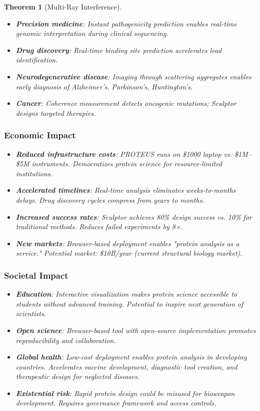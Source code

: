 \documentclass[11pt,a4paper]{article}
\newtheorem{theorem}{Theorem}[section]
\begin{document}
\begin{theorem}[Multi-Ray Interference]
\begin{itemize}
\item \textbf{Precision medicine}: Instant pathogenicity prediction enables real-time genomic interpretation during clinical sequencing.
\item \textbf{Drug discovery}: Real-time binding site prediction accelerates lead identification.
\item \textbf{Neurodegenerative disease}: Imaging through scattering aggregates enables early diagnosis of Alzheimer's, Parkinson's, Huntington's.
\item \textbf{Cancer}: Coherence measurement detects oncogenic mutations; Sculptor designs targeted therapies.
\end{itemize}

\subsubsection{Economic Impact}

\begin{itemize}
\item \textbf{Reduced infrastructure costs}: PROTEUS runs on \$1000 laptop vs. \$1M--\$5M instruments. Democratizes protein science for resource-limited institutions.
\item \textbf{Accelerated timelines}: Real-time analysis eliminates weeks-to-months delays. Drug discovery cycles compress from years to months.
\item \textbf{Increased success rates}: Sculptor achieves 80\% design success vs. 10\% for traditional methods. Reduces failed experiments by 8×.
\item \textbf{New markets}: Browser-based deployment enables "protein analysis as a service." Potential market: \$10B/year (current structural biology market).
\end{itemize}

\subsubsection{Societal Impact}

\begin{itemize}
\item \textbf{Education}: Interactive visualization makes protein science accessible to students without advanced training. Potential to inspire next generation of scientists.
\item \textbf{Open science}: Browser-based tool with open-source implementation promotes reproducibility and collaboration.
\item \textbf{Global health}: Low-cost deployment enables protein analysis in developing countries. Accelerates vaccine development, diagnostic tool creation, and therapeutic design for neglected diseases.
\item \textbf{Existential risk}: Rapid protein design could be misused for bioweapon development. Requires governance framework and access controls.
\end{itemize}


\end{theorem}
\end{document}
